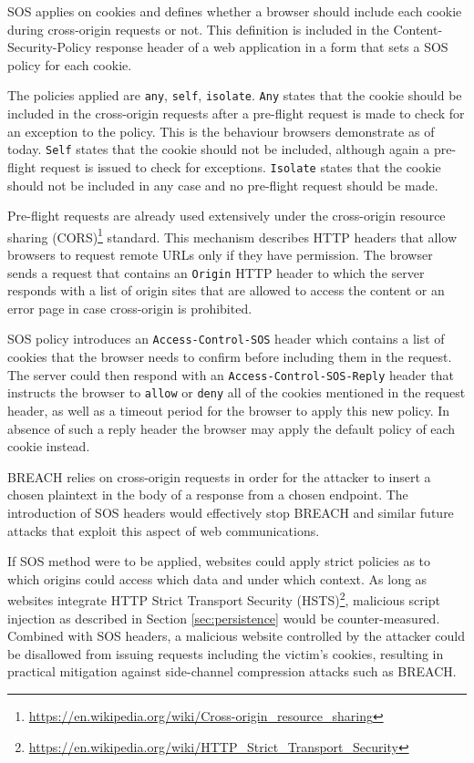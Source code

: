 SOS applies on cookies and defines whether a browser should include each cookie
during cross-origin requests or not. This definition is included in the
Content-Security-Policy response header of a web application in a form that
sets a SOS policy for each cookie.

The policies applied are \texttt{any}, \texttt{self}, \texttt{isolate}.
\texttt{Any} states that the cookie should be included in the cross-origin
requests after a pre-flight request is made to check for an exception to the
policy. This is the behaviour browsers demonstrate as of today. \texttt{Self}
states that the cookie should not be included, although again a pre-flight
request is issued to check for exceptions. \texttt{Isolate} states that the
cookie should not be included in any case and no pre-flight request should be
made.

Pre-flight requests are already used extensively under the cross-origin resource
sharing
(CORS)\footnote{\url{https://en.wikipedia.org/wiki/Cross-origin_resource_sharing}}
standard.  This mechanism describes HTTP headers that allow browsers to request
remote URLs only if they have permission. The browser sends a request that
contains an \texttt{Origin} HTTP header to which the server responds with a
list of origin sites that are allowed to access the content or an error page
in case cross-origin is prohibited.

SOS policy introduces an \texttt{Access-Control-SOS} header which contains a
list of cookies that the browser needs to confirm before including them in the
request. The server could then respond with an \texttt{Access-Control-SOS-Reply}
header that instructs the browser to \texttt{allow} or \texttt{deny} all of the
cookies mentioned in the request header, as well as a timeout period for the
browser to apply this new policy. In absence of such a reply header the browser
may apply the default policy of each cookie instead.

BREACH relies on cross-origin requests in order for the attacker to insert a
chosen plaintext in the body of a response from a chosen endpoint. The
introduction of SOS headers would effectively stop BREACH and similar future
attacks that exploit this aspect of web communications.

If SOS method were to be applied, websites could apply strict policies as to
which origins could access which data and under which context. As long as
websites integrate HTTP Strict Transport Security
(HSTS)\footnote{\url{https://en.wikipedia.org/wiki/HTTP_Strict_Transport_Security}},
malicious script injection as described in Section \ref{sec:persistence} would
be counter-measured. Combined with SOS headers, a malicious website controlled
by the attacker could be disallowed from issuing requests including the victim's
cookies, resulting in practical mitigation against side-channel compression
attacks such as BREACH.

